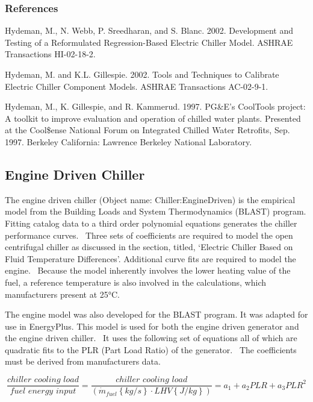 \subsubsection{References}\label{references-1-003}

Hydeman, M., N. Webb, P. Sreedharan, and S. Blanc. 2002. Development and Testing of a Reformulated Regression-Based Electric Chiller Model. ASHRAE Transactions HI-02-18-2.

Hydeman, M. and K.L. Gillespie. 2002. Tools and Techniques to Calibrate Electric Chiller Component Models. ASHRAE Transactions AC-02-9-1.

Hydeman, M., K. Gillespie, and R. Kammerud. 1997. PG\&E's CoolTools project: A toolkit to improve evaluation and operation of chilled water plants. Presented at the Cool\$ense National Forum on Integrated Chilled Water Retrofits, Sep. 1997. Berkeley California: Lawrence Berkeley National Laboratory.

\subsection{Engine Driven Chiller}\label{engine-driven-chiller}

The engine driven chiller (Object name: Chiller:EngineDriven) is the empirical model from the Building Loads and System Thermodynamics (BLAST) program. Fitting catalog data to a third order polynomial equations generates the chiller performance curves.~ Three sets of coefficients are required to model the open centrifugal chiller as discussed in the section, titled, `Electric Chiller Based on Fluid Temperature Differences'. Additional curve fits are required to model the engine.~ Because the model inherently involves the lower heating value of the fuel, a reference temperature is also involved in the calculations, which manufacturers present at 25°C.

The engine model was also developed for the BLAST program. It was adapted for use in EnergyPlus. This model is used for both the engine driven generator and the engine driven chiller.~ It uses the following set of equations all of which are quadratic fits to the PLR (Part Load Ratio) of the generator.~ The coefficients must be derived from manufacturers data.

\begin{equation}
\frac{{chiller\,\,cooling\,\,load}}{{fuel\,\,energy\,\,input}} = \frac{{chiller\,\,cooling\,\,load}}{{\left( {{{\dot m}_{fuel}}\left\{ {kg/s} \right\} \cdot LHV\left\{ {J/kg} \right\}} \right)}} = {a_1} + {a_2}PLR + {a_3}PL{R^2}
\end{equation}

